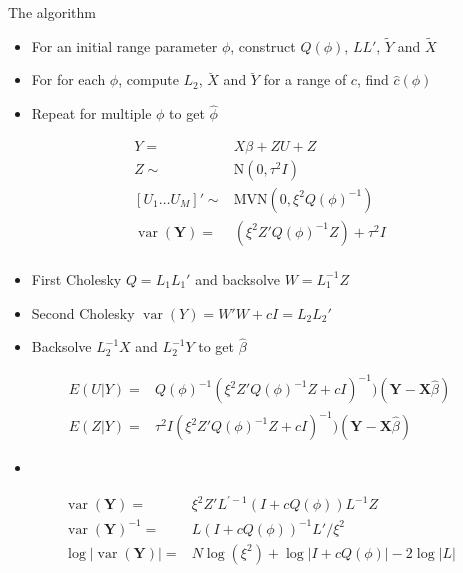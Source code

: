 \documentclass[12pt]{article}
\DeclareMathOperator{\var}{var}
\begin{document}
 


The algorithm
\begin{itemize}
  \item For an initial range parameter $\phi$, construct $Q(\phi)$, $LL'$,
  $\tilde Y$ and $\tilde X$
  \item For for each $\phi$, compute $L_2$, $\breve X$ and $\breve Y$ for a
  range of $c$, find $\hat c(\phi)$
  \item Repeat for multiple $\phi$ to get $\hat \phi$
\end{itemize}


\begin{align*}
Y = & X \beta + Z U + Z\\
Z \sim & \text{N}(0, \tau^2I )\\
[U_1 \ldots U_M]' \sim  & \text{MVN}(0, \xi^2 Q(\phi)^{-1})\\
\var(\mathbf{Y})  = &  ( \xi^2 Z' Q(\phi)^{-1}Z)  + \tau^2 I    \\
\end{align*}

\begin{itemize}
\item First Cholesky  $Q = L_1 L_1'$ and backsolve $W = L_1^{-1}Z$
\item Second Cholesky $\var(Y) = W'W + c I = L_2 L_2'$
\item Backsolve $L_2^{-1}X$ and  $L_2^{-1}Y$ to get $\hat\beta$
\end{itemize}

\begin{align*}
E(U|Y) = &  Q(\phi)^{-1}
(\xi^2 Z' Q(\phi)^{-1}Z + c I)^{-1})
(\mathbf{Y} - \mathbf{X}\hat\beta)\\
E(Z|Y) = & \tau^2 I(\xi^2 Z' Q(\phi)^{-1}Z + c I)^{-1})
(\mathbf{Y} - \mathbf{X}\hat\beta)
\end{align*}

\begin{itemize}
  \item
\end{itemize}
\begin{align*}
\var(\mathbf{Y}) = &  \xi^2  Z ' L^{\prime -1}(  I + c  Q(\phi)  ) L^{-1} Z\\
\var(\mathbf{Y})^{-1} = &    L(  I + c  Q(\phi)  )^{-1} L' / \xi^2\\
\log |\var(\mathbf{Y})| = & N \log(\xi^2) + \log |I + c Q(\phi)| -
2 \log |L|\\
\end{align*}
\end{document}
